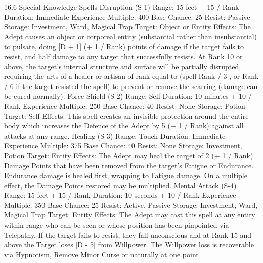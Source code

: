 \documentclass[a4paper]{article}
\begin{document}
\begin{multicols}{3}
16.6 Special Knowledge Spells
Disruption (S-1)
Range: 15 feet + 15 / Rank
Duration: Immediate
Experience Multiple: 400
Base Chance: 25%
Resist: Passive
Storage: Investment, Ward, Magical Trap
Target: Object or Entity
Effects: The Adept causes an object or corporeal
entity (substantial rather than insubstantial) to
pulsate, doing [D + 1] (+ 1 / Rank) points of damage if the target fails to resist, and half damage to
any target that successfully resists. At Rank 10 or
above, the target’s internal structure and surface
will be partially disrupted, requiring the arts of a
healer or artisan of rank equal to (spell Rank / 3 ,
or Rank / 6 if the target resisted the spell) to prevent or remove the scarring (damage can be cured
normally).
Force Shield (S-2)
Range: Self
Duration: 10 minutes + 10 / Rank
Experience Multiple: 250
Base Chance: 40%
Resist: None
Storage: Potion
Target: Self
Effects: This spell creates an invisible protection
around the entire body which increases the Defence of the Adept by 5 (+ 1 / Rank) against all
attacks at any range.
Healing (S-3)
Range: Touch
Duration: Immediate
Experience Multiple: 375
Base Chance: 40%
Resist: None
Storage: Investment, Potion
Target: Entity
Effects: The Adept may heal the target of 2 (+ 1 /
Rank) Damage Points that have been removed
from the target’s Fatigue or Endurance. Endurance
damage is healed first, wrapping to Fatigue damage. On a multiple effect, the Damage Points restored may be multiplied.
Mental Attack (S-4)
Range: 15 feet + 15 / Rank
Duration: 10 seconds + 10 / Rank
Experience Multiple: 350
Base Chance: 25%
Resist: Active, Passive
Storage: Investment, Ward, Magical Trap
Target: Entity
Effects: The Adept may cast this spell at any entity
within range who can be seen or whose position
has been pinpointed via Telepathy. If the target
fails to resist, they fall unconscious and at Rank 15
and above the Target loses [D - 5] from Willpower.
The Willpower loss is recoverable via Hypnotism,
Remove Minor Curse or naturally at one point


\end{multicols}
\end{document}
